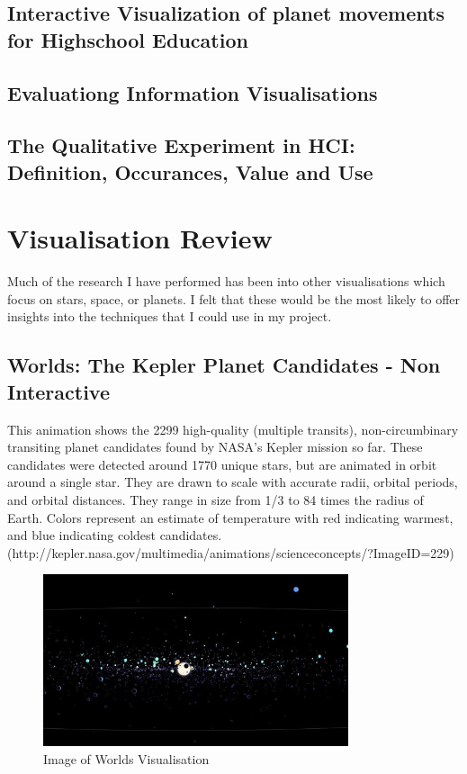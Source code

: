\documentclass[11pt
              , a4paper
              , twoside
              , openright
              ]{report}
\begin{document}
\subsection{Interactive Visualization of planet movements for Highschool Education}
\subsection{Evaluationg Information Visualisations}
\subsection{The Qualitative Experiment in HCI: Definition, Occurances, Value and Use}
\section{Visualisation Review}
Much of the research I have performed has been into other visualisations which focus on stars, space, or planets. I felt that these would be the most likely to offer insights into the techniques that I could use in my project.
\subsection{Worlds: The Kepler Planet Candidates - Non Interactive}
This animation shows the 2299 high-quality (multiple transits), non-circumbinary transiting planet candidates found by NASA's Kepler mission so far. These candidates were detected around 1770 unique stars, but are animated in orbit around a single star. They are drawn to scale with accurate radii, orbital periods, and orbital distances. They range in size from 1/3 to 84 times the radius of Earth. Colors represent an estimate of temperature with red indicating warmest, and blue indicating coldest candidates. (http://kepler.nasa.gov/multimedia/animations/scienceconcepts/?ImageID=229)
\begin{figure}[h!]
  \centering
      \includegraphics[width=0.8\textwidth]{images/worlds.jpg}
  \caption{Image of Worlds Visualisation}
\end{figure}
\end{document}

